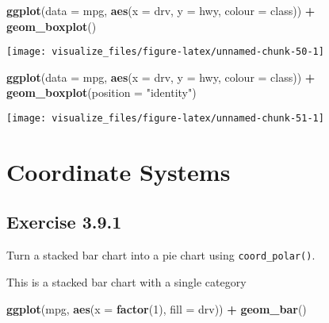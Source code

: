 \documentclass[]{book}
\newenvironment{Shaded}{\begin{snugshade}}{\end{snugshade}}
\newcommand{\DataTypeTok}[1]{\textcolor[rgb]{0.13,0.29,0.53}{#1}}
\newcommand{\DecValTok}[1]{\textcolor[rgb]{0.00,0.00,0.81}{#1}}
\newcommand{\KeywordTok}[1]{\textcolor[rgb]{0.13,0.29,0.53}{\textbf{#1}}}
\newcommand{\NormalTok}[1]{#1}
\newcommand{\OperatorTok}[1]{\textcolor[rgb]{0.81,0.36,0.00}{\textbf{#1}}}
\newcommand{\StringTok}[1]{\textcolor[rgb]{0.31,0.60,0.02}{#1}}
\theoremstyle{plain}
\theoremstyle{remark}
\theoremstyle{definition}
\theoremstyle{definition}
\theoremstyle{definition}
\theoremstyle{remark}
\begin{document}
\begin{Shaded}
\begin{Highlighting}[]
\KeywordTok{ggplot}\NormalTok{(}\DataTypeTok{data =}\NormalTok{ mpg, }\KeywordTok{aes}\NormalTok{(}\DataTypeTok{x =}\NormalTok{ drv, }\DataTypeTok{y =}\NormalTok{ hwy, }\DataTypeTok{colour =}\NormalTok{ class)) }\OperatorTok{+}
\StringTok{  }\KeywordTok{geom_boxplot}\NormalTok{()}
\end{Highlighting}
\end{Shaded}

\begin{center}\texttt{[image: visualize\_files/figure-latex/unnamed-chunk-50-1]} \end{center}

\begin{Shaded}
\begin{Highlighting}[]
\KeywordTok{ggplot}\NormalTok{(}\DataTypeTok{data =}\NormalTok{ mpg, }\KeywordTok{aes}\NormalTok{(}\DataTypeTok{x =}\NormalTok{ drv, }\DataTypeTok{y =}\NormalTok{ hwy, }\DataTypeTok{colour =}\NormalTok{ class)) }\OperatorTok{+}
\StringTok{  }\KeywordTok{geom_boxplot}\NormalTok{(}\DataTypeTok{position =} \StringTok{"identity"}\NormalTok{)}
\end{Highlighting}
\end{Shaded}

\begin{center}\texttt{[image: visualize\_files/figure-latex/unnamed-chunk-51-1]} \end{center}

\hypertarget{coordinate-systems}{%
\section{Coordinate Systems}\label{coordinate-systems}}

\hypertarget{exercise-3.9.1}{%
\subsection*{\texorpdfstring{Exercise
{3.9.1}}{Exercise 3.9.1}}\label{exercise-3.9.1}}

Turn a stacked bar chart into a pie chart using \texttt{coord\_polar()}.

This is a stacked bar chart with a single category

\begin{Shaded}
\begin{Highlighting}[]
\KeywordTok{ggplot}\NormalTok{(mpg, }\KeywordTok{aes}\NormalTok{(}\DataTypeTok{x =} \KeywordTok{factor}\NormalTok{(}\DecValTok{1}\NormalTok{), }\DataTypeTok{fill =}\NormalTok{ drv)) }\OperatorTok{+}
\StringTok{  }\KeywordTok{geom_bar}\NormalTok{()}
\end{Highlighting}
\end{Shaded}
\end{document}
